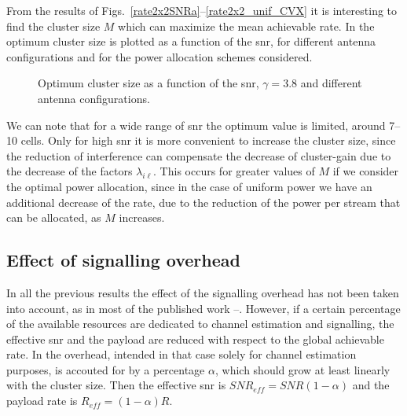 From the results of Figs.~\ref{rate2x2SNRa}--\ref{rate2x2_unif_CVX} it is interesting to find the cluster size $M$ which can maximize the mean achievable rate. In  the optimum cluster size is plotted as a function of the \gls{snr}, for different antenna configurations and for the power allocation schemes considered.
\begin{figure}[h]
\begin{center}
\begin{small}
\end{small}
\end{center}
\vspace*{-2.7mm}\caption{Optimum cluster size as a function of the \gls{snr}, $\gamma=3.8$ and different antenna configurations.}\label{OptimumvsSNRbeta38}
\end{figure}
We can note that for a wide range of \gls{snr} the optimum value is limited, around 7--10 cells. Only for high \gls{snr} it is more convenient to increase the cluster size, since the reduction of interference can compensate the decrease of cluster-gain due to the decrease of the factors $\lambda_{i\ell}$. This occurs for greater values of $M$ if we consider the optimal power allocation, since in the case of uniform power we have an additional decrease of the rate, due to the reduction of the power per stream that can be allocated, as $M$ increases.   

\subsection{Effect of signalling overhead}

In all the previous results the effect of the signalling overhead has not been taken into account, as in most of the published work \cite{sun11}--\cite{huang09}.
However, if a certain percentage of the available resources are dedicated to channel estimation and signalling, the effective \gls{snr} and the payload are reduced with respect to the global achievable rate.
In \cite{lozano13} the overhead, intended in that case solely for channel estimation purposes, is accouted for by a percentage $\alpha$, which should grow at least linearly with the cluster size. Then the effective \gls{snr} is $SNR_{eff} = SNR (1-\alpha)$ and the payload rate is $R_{eff}=(1-\alpha)R$. 

